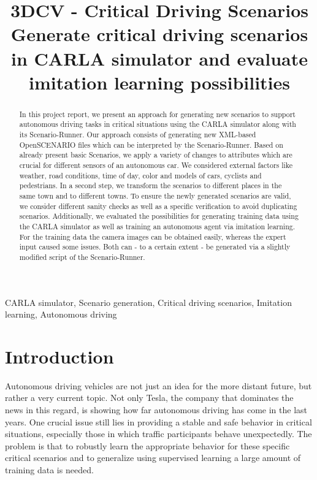 \documentclass[conference, a4paper, 11pt]{IEEEtran}
\begin{document}
\title{3DCV - Critical Driving Scenarios\\
{\small Generate critical driving scenarios in CARLA simulator and evaluate imitation learning possibilities}
}

\author{
    \and
    \and
    \and
}

\maketitle

\begin{abstract}
	In this project report, we present an approach for generating new scenarios to support autonomous driving tasks in critical situations using the CARLA simulator along with its Scenario-Runner. Our approach consists of generating new XML-based OpenSCENARIO files which can be interpreted by the Scenario-Runner. Based on already present basic Scenarios, we apply a variety  of changes to attributes which are crucial for different sensors of an autonomous car. We considered external factors like weather, road conditions, time of day, color and models of cars, cyclists and pedestrians. In a second step, we transform the scenarios to different places in the same town and to different towns. To ensure the newly generated scenarios are valid, we consider different sanity checks as well as a specific verification to avoid duplicating scenarios.
	Additionally, we evaluated the possibilities for generating training data using the CARLA simulator as well as training an autonomous agent via imitation learning. For the training data the camera images can be obtained easily, whereas the expert input caused some issues. Both can - to a certain extent - be generated via a slightly modified script of the Scenario-Runner.

\end{abstract}

\begin{IEEEkeywords}
CARLA simulator, Scenario generation, Critical driving scenarios, Imitation learning, Autonomous driving
\end{IEEEkeywords}

\section{Introduction}
Autonomous driving vehicles are not just an idea for the more distant future, but rather a very current topic.
Not only Tesla, the company that dominates the news in this regard, is showing how far autonomous driving has come in the last years.
One crucial issue still lies in providing a stable and safe behavior in critical situations, especially those in which traffic participants behave unexpectedly. 
The problem is that to robustly learn the appropriate behavior for these specific critical scenarios and to generalize using supervised learning a large amount of training data is needed.
\end{document}
